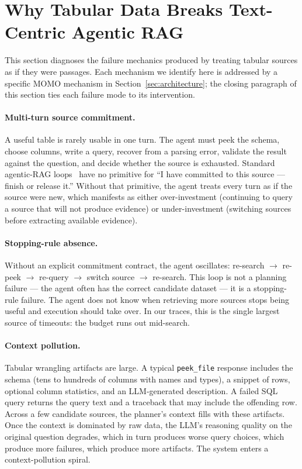 \section{Why Tabular Data Breaks Text-Centric Agentic RAG}
\label{sec:diagnosis}

This section diagnoses the failure mechanics produced by treating tabular sources as if they were passages. Each mechanism we identify here is addressed by a specific MOMO mechanism in Section~\ref{sec:architecture}; the closing paragraph of this section ties each failure mode to its intervention.

\paragraph{Multi-turn source commitment.} A useful table is rarely usable in one turn. The agent must peek the schema, choose columns, write a query, recover from a parsing error, validate the result against the question, and decide whether the source is exhausted. Standard agentic-RAG loops~\cite{yao2023react,trivedi2023ircot} have no primitive for ``I have committed to this source --- finish or release it.'' Without that primitive, the agent treats every turn as if the source were new, which manifests as either over-investment (continuing to query a source that will not produce evidence) or under-investment (switching sources before extracting available evidence).

\paragraph{Stopping-rule absence.} Without an explicit commitment contract, the agent oscillates: re-search $\to$ re-peek $\to$ re-query $\to$ switch source $\to$ re-search. This loop is not a planning failure --- the agent often has the correct candidate dataset --- it is a stopping-rule failure. The agent does not know when retrieving more sources stops being useful and execution should take over. In our traces, this is the single largest source of timeouts: the budget runs out mid-search.

\paragraph{Context pollution.} Tabular wrangling artifacts are large. A typical \texttt{peek\_file} response includes the schema (tens to hundreds of columns with names and types), a snippet of rows, optional column statistics, and an LLM-generated description. A failed SQL query returns the query text and a traceback that may include the offending row. Across a few candidate sources, the planner's context fills with these artifacts. Once the context is dominated by raw data, the LLM's reasoning quality on the original question degrades, which in turn produces worse query choices, which produce more failures, which produce more artifacts. The system enters a context-pollution spiral.

